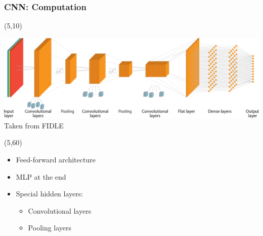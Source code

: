 \begin{frame}
  \frametitle{\acl{CNN}: Computation}
  \hypertarget<4>{CNN_Overview_Convolutional}{}
  \hypertarget<5>{CNN_Overview_Pooling}{}

  \begin{textblock}{90}(5,10)
    \begin{center}
      \includegraphics[width=\textwidth]{img/CNN.png}
      Taken from FIDLE
    \end{center}
  \end{textblock}

  \begin{textblock}{45}(5,60)
    \begin{itemize}
    \item Feed-forward architecture
    \item<2-> \ac{MLP} at the end
    \item<3-> Special hidden layers:
      \begin{itemize}
      \item Convolutional layers \hyperlink{Convolutional_Layers}{}
      \item Pooling layers \hyperlink{Pooling_Layers}{}
      \end{itemize}
    \end{itemize}
  \end{textblock}


\end{frame}
